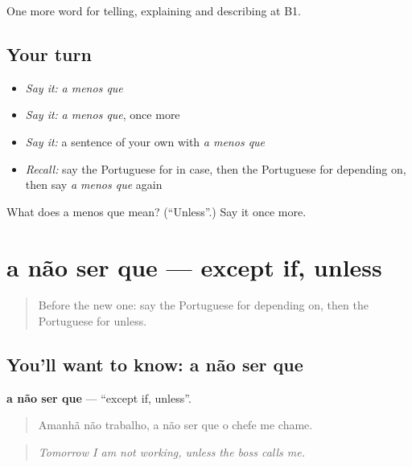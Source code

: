 \begin{grammarlens}[title={What you've built}]
One more word for telling, explaining and describing at B1.
\end{grammarlens}

\subsection*{Your turn}
\begin{itemize}
\raggedright
  \item \emph{Say it:} \emph{a menos que}
  \item \emph{Say it:} \emph{a menos que}, once more
  \item \emph{Say it:} a sentence of your own with \emph{a menos que}
  \item \emph{Recall:} say the Portuguese for in case, then the Portuguese for depending on, then say \emph{a menos que} again
\end{itemize}

\begin{tcolorbox}[breakable,colback=teal!4,colframe=teal!35!black,title={Before you move on}]
What does a menos que mean? (\textquotedblleft{}Unless\textquotedblright{}.) Say it once more.
\end{tcolorbox}
\section[a não ser que]{a não ser que — except if, unless}

\label{lesson:PT-C370-a-nao-ser-que}



\begin{quote}
Before the new one: say the Portuguese for depending on, then the Portuguese for unless.
\end{quote}

\subsection*{You'll want to know: a não ser que}
\textbf{a não ser que} — \textquotedblleft{}except if, unless\textquotedblright{}.

\begin{quote}
Amanhã não trabalho, a não ser que o chefe me chame.
\end{quote}

\begin{quote}
\emph{Tomorrow I am not working, unless the boss calls me.}
\end{quote}

